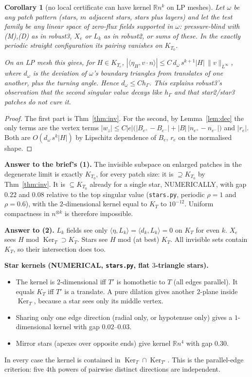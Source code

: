 \documentclass[11pt]{article}
\newtheorem{corollary}[theorem]{Corollary}
\theoremstyle{remark}
\newcommand{\hG}{h_\Gamma}
\newcommand{\ip}[2]{\langle #1,#2\rangle}
\begin{document}
\begin{corollary}[no local certificate can have kernel $\mathbb Rn^k$ on LP meshes]\label{cor:nolocal}
Let $\omega$ be any patch pattern (stars, $m$ adjacent stars, stars plus layers) and let the test family be any linear space of
zero-flux fields supported in $\omega$: pressure-blind with (M),(D) as in robust3, $X_e$ or $L_k$ as in robust2, or sums of
these. In the exactly periodic straight configuration its pairing vanishes on $K_{T_0}$.

On an LP mesh this gives, for $H\in K_{T_e}$, $|\ip{\eta_H}{v\cdot n}|\le C\,d_\omega\,s^{k+1}|H|\,\|v\|_{L^\infty}$, where $d_\omega$
is the deviation of $\omega$'s boundary triangles from translates of one another, plus the turning angle. Hence
$d_\omega\le C\hG$. This explains robust3's observation that the second singular value decays like $\hG$ and that star2/star3
patches do not cure it.
\end{corollary}
\begin{proof}
The first part is Thm~\ref{thm:inv}. For the second, by Lemma~\ref{lem:dec} the only terms are the vertex terms
$|w_z|\le C|e|\big(|B_{e^+}-B_{e^-}|+|B|\,|n_{e^+}-n_{e^-}|\big)$ and $|r_e|$. Both are $O(d_\omega\,s^k|H|)$ by
Lipschitz dependence of $B_e$, $r_e$ on the normalised shape.
\end{proof}
\noindent\textbf{Answer to the brief's (1).} The invisible subspace on enlarged patches in the degenerate limit is exactly
$K_{T_0}$, for every patch size: it is $\supseteq K_{T_0}$ by Thm~\ref{thm:inv}. It is $\subseteq K_{T_0}$ already for a single
star, NUMERICALLY, with gap $0.22$ and $0.08$ relative to the top singular value (\texttt{stars.py}, periodic $\rho=1$ and
$\rho=0.6$), with the $2$-dimensional kernel equal to $K_T$ to $10^{-12}$. Uniform compactness in $n^{\otimes k}$ is therefore
impossible.

\noindent\textbf{Answer to (2).} $L_k$ fields see only $\ip{\eta}{L_k}=\ip{d_k}{L_k}=0$ on $K_T$ for even $k$.
$X_e$ sees $H$ mod $\operatorname{Ker}_T\supset K_T$. Stars see $H$ mod (at best) $K_T$. All invisible sets contain $K_T$, so
their intersection does too.

\noindent\textbf{Star kernels (NUMERICAL, \texttt{stars.py}, flat $3$-triangle stars).}
\begin{itemize}
\item The kernel is $2$-dimensional iff $T'$ is homothetic to $T$ (all edges parallel). It equals $K_T$ iff $T'$ is a
translate. A pure dilation gives another $2$-plane inside $\operatorname{Ker}_T$, because a star sees only its middle vertex.
\item Sharing only one edge direction (radial only, or hypotenuse only) gives a $1$-dimensional kernel with gap $0.02$--$0.03$.
\item Mirror stars (apexes over opposite ends) give kernel $\mathbb Rn^4$ with gap $0.30$.
\end{itemize}
In every case the kernel is contained in $\operatorname{Ker}_T\cap\operatorname{Ker}_{T'}$. This is the parallel-edge criterion:
five $4$th powers of pairwise distinct directions are independent.
\end{document}
